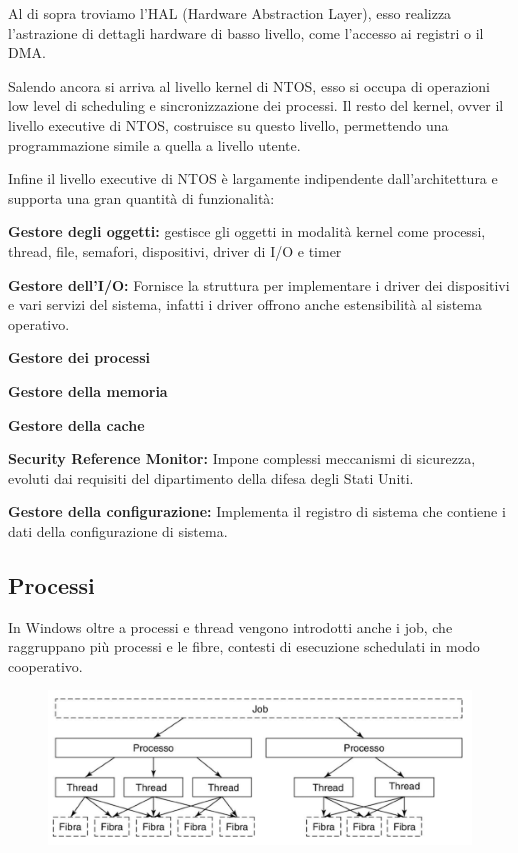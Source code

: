 \spacer
Al di sopra troviamo l'HAL (Hardware Abstraction Layer), esso realizza l'astrazione di dettagli hardware di basso livello, come l'accesso ai registri o il DMA.

\spacer
Salendo ancora si arriva al livello kernel di NTOS, esso si occupa di operazioni low level di scheduling e sincronizzazione dei processi. Il resto del kernel, ovver il livello executive di NTOS, costruisce su questo livello, permettendo una programmazione simile a quella a livello utente.

\spacer
Infine il livello executive di NTOS è largamente indipendente dall'architettura e supporta una gran quantità di funzionalità:
\begin{sitemize}
    \item \textbf{Gestore degli oggetti:} gestisce gli oggetti in modalità kernel come processi, thread, file, semafori, dispositivi, driver di I/O e timer
    \item \textbf{Gestore dell'I/O:} Fornisce la struttura per implementare i driver dei dispositivi e vari servizi del sistema, infatti i driver offrono anche estensibilità al sistema operativo.
    \item \textbf{Gestore dei processi}
    \item \textbf{Gestore della memoria}
    \item \textbf{Gestore della cache}
    \item \textbf{Security Reference Monitor:} Impone complessi meccanismi di sicurezza, evoluti dai requisiti del dipartimento della difesa degli Stati Uniti.
    \item \textbf{Gestore della configurazione:} Implementa il registro di sistema che contiene i dati della configurazione di sistema.
\end{sitemize}

\subsection{Processi}

In Windows oltre a processi e thread vengono introdotti anche i job, che raggruppano più processi e le fibre, contesti di esecuzione schedulati in modo cooperativo.

\begin{figure}[H]
    \centering
    \includegraphics[width=0.75\linewidth]{assets/Windows-job.png}
\end{figure}

